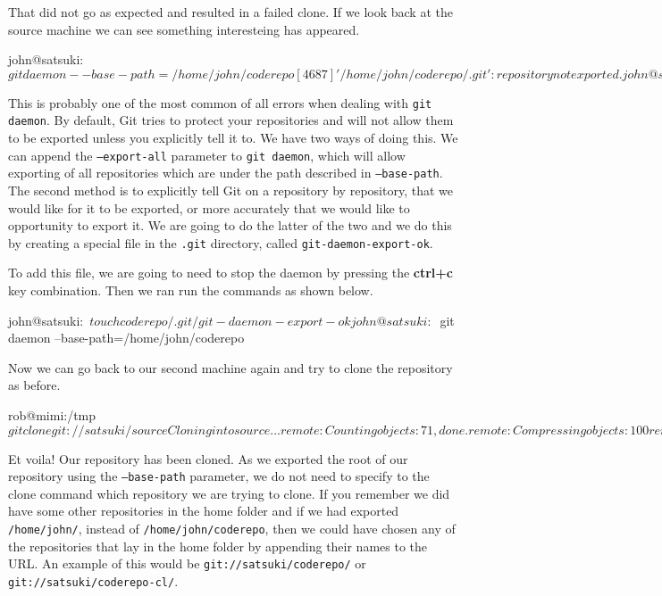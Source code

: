 That did not go as expected and resulted in a failed clone.
If we look back at the source machine we can see something interesteing has appeared.

\begin{code}
john@satsuki:~$ git daemon --base-path=/home/john/coderepo
[4687] '/home/john/coderepo/.git': repository not exported.
john@satsuki:~$
\end{code}

This is probably one of the most common of all errors when dealing with \texttt{git daemon}.
By default, Git tries to protect your repositories and will not allow them to be exported unless you explicitly tell it to.
We have two ways of doing this.
We can append the \texttt{--export-all} parameter to \texttt{git daemon}, which will allow exporting of all repositories which are under the path described in \texttt{--base-path}.
The second method is to explicitly tell Git on a repository by repository, that we would like for it to be exported, or more accurately that we would like to opportunity to export it.
We are going to do the latter of the two and we do this by creating a special file in the \texttt{.git} directory, called \texttt{git-daemon-export-ok}.

To add this file, we are going to need to stop the daemon by pressing the \textbf{ctrl+c} key combination.
Then we ran run the commands as shown below.

\begin{code}
john@satsuki:~$ touch coderepo/.git/git-daemon-export-ok
john@satsuki:~$ git daemon --base-path=/home/john/coderepo

\end{code}

Now we can go back to our second machine again and try to clone the repository as before.

\begin{code}
rob@mimi:/tmp$ git clone git://satsuki/ source
Cloning into source...
remote: Counting objects: 71, done.
remote: Compressing objects: 100%
remote: Total 71 (delta 16), reused 0 (delta 0)
Receiving objects: 100%
Resolving deltas: 100%
rob@mimi:/tmp$
\end{code}

Et voila! Our repository has been cloned.
As we exported the root of our repository using the \texttt{--base-path} parameter, we do not need to specify to the clone command which repository we are trying to clone.
If you remember we did have some other repositories in the home folder and if we had exported \texttt{/home/john/}, instead of \texttt{/home/john/coderepo},
then we could have chosen any of the repositories that lay in the home folder by appending their names to the URL.
An example of this would be \texttt{git://satsuki/coderepo/} or \texttt{git://satsuki/coderepo-cl/}.

